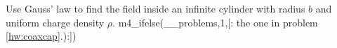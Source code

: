 Use Gauss' law to find the field inside an
        infinite cylinder with radius $b$ and uniform
        charge density $\rho$. 
m4_ifelse(__problems,1,[:%
        the one in problem \ref{hw:coaxcap}.):])%
\answercheck
